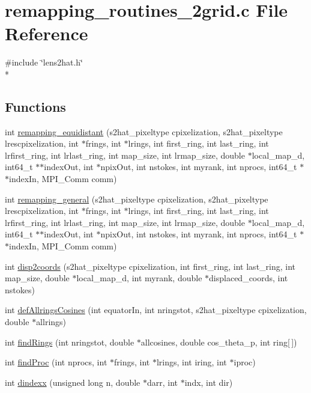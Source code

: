 \section{remapping\-\_\-routines\-\_\-2grid.\-c File Reference}
\label{remapping__routines__2grid_8c}
{\ttfamily \#include \char`\"{}lens2hat.\-h\char`\"{}}\\*
\subsection*{Functions}
\begin{DoxyCompactItemize}
\item 
int \hyperlink{remapping__routines__2grid_8c_aa829032557d0253f9757b049e87b5537}{remapping\-\_\-equidistant} (s2hat\-\_\-pixeltype cpixelization, s2hat\-\_\-pixeltype lrescpixelization, int $\ast$frings, int $\ast$lrings, int first\-\_\-ring, int last\-\_\-ring, int lrfirst\-\_\-ring, int lrlast\-\_\-ring, int map\-\_\-size, int lrmap\-\_\-size, double $\ast$local\-\_\-map\-\_\-d, int64\-\_\-t $\ast$$\ast$index\-Out, int $\ast$npix\-Out, int nstokes, int myrank, int nprocs, int64\-\_\-t $\ast$$\ast$index\-In, M\-P\-I\-\_\-\-Comm comm)
\item 
int \hyperlink{remapping__routines__2grid_8c_a93805e94f014beb4f1f2665303b82ca0}{remapping\-\_\-general} (s2hat\-\_\-pixeltype cpixelization, s2hat\-\_\-pixeltype lrescpixelization, int $\ast$frings, int $\ast$lrings, int first\-\_\-ring, int last\-\_\-ring, int lrfirst\-\_\-ring, int lrlast\-\_\-ring, int map\-\_\-size, int lrmap\-\_\-size, double $\ast$local\-\_\-map\-\_\-d, int64\-\_\-t $\ast$$\ast$index\-Out, int $\ast$npix\-Out, int nstokes, int myrank, int nprocs, int64\-\_\-t $\ast$$\ast$index\-In, M\-P\-I\-\_\-\-Comm comm)
\item 
int \hyperlink{remapping__routines__2grid_8c_a8224d455c626532938c1729f5e62daee}{disp2coords} (s2hat\-\_\-pixeltype cpixelization, int first\-\_\-ring, int last\-\_\-ring, int map\-\_\-size, double $\ast$local\-\_\-map\-\_\-d, int myrank, double $\ast$displaced\-\_\-coords, int nstokes)
\item 
int \hyperlink{remapping__routines__2grid_8c_af6cfda4741a11339b5a1d9c599411b87}{def\-Allrings\-Cosines} (int equator\-In, int nringstot, s2hat\-\_\-pixeltype cpixelization, double $\ast$allrings)
\item 
int \hyperlink{remapping__routines__2grid_8c_a95c082e86d6e644f4789485021f90235}{find\-Rings} (int nringstot, double $\ast$allcosines, double cos\-\_\-theta\-\_\-p, int ring\mbox{[}$\,$\mbox{]})
\item 
int \hyperlink{remapping__routines__2grid_8c_af4ba917a5b9f32394911c8d28d6c2d07}{find\-Proc} (int nprocs, int $\ast$frings, int $\ast$lrings, int iring, int $\ast$iproc)
\item 
int \hyperlink{remapping__routines__2grid_8c_ad574f0dfca1f8db2b630a9b6cf3a45c9}{dindexx} (unsigned long n, double $\ast$darr, int $\ast$indx, int dir)
\end{DoxyCompactItemize}


